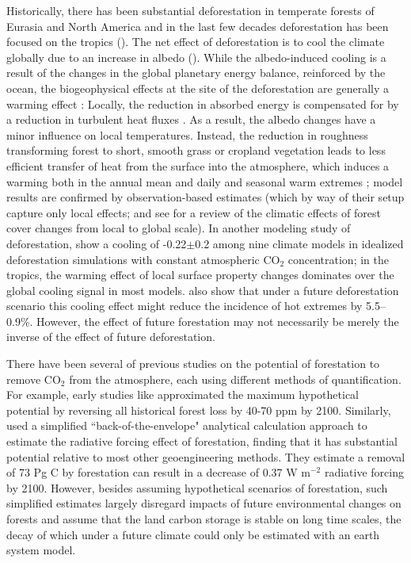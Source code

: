 \documentclass[]{article}
\begin{document}
Historically, there has been substantial deforestation in temperate forests of Eurasia and North America and in the last few decades deforestation has been focused on the tropics (\cite{goldewijk_estimating_2001}).
The net effect of deforestation is to cool the climate globally due to an increase in albedo (\cite{davin_climatic_2010}).
While the albedo-induced cooling is a result of the changes in the global planetary energy balance, reinforced by the ocean, the biogeophysical effects at the site of the deforestation are generally a warming effect \parencite{winckler_nonlocal_2019}: Locally, the reduction in absorbed energy is compensated for by a reduction in turbulent heat fluxes \parencite{winckler_importance_2019}.
As a result, the albedo changes have a minor influence on local temperatures.
Instead, the reduction in roughness transforming forest to short, smooth grass or cropland vegetation leads to less efficient transfer of heat from the surface into the atmosphere, which induces a warming both in the annual mean and daily and seasonal warm extremes \parencite{winckler_different_2019}; model results are confirmed by observation-based estimates (which by way of their setup capture only local effects;  \parencite{alkama_biophysical_2016,bright_local_2017} and see \cite{pongratz_land_2021} for a review of the climatic effects of forest cover changes from local to global scale).
In another modeling study of deforestation, \cite{boysen_global_2020} show a cooling of -0.22$\pm$0.2 \textcelsius{} among nine climate models in idealized deforestation simulations with constant atmospheric CO$_2$ concentration; in the tropics, the warming effect of local surface property changes dominates over the global cooling signal in most models.
\cite{hong_impacts_2022} also show that under a future deforestation scenario this cooling effect might reduce the incidence of hot extremes by 5.5--0.9\%.
However, the effect of future forestation may not necessarily be merely the inverse of the effect of future deforestation.

There have been several of previous studies on the potential of forestation to remove CO$_2$ from the atmosphere, each using different methods of quantification.
For example, early studies like \cite{house_maximum_2002} approximated the maximum hypothetical potential by reversing all historical forest loss by 40-70 ppm by 2100. Similarly, \cite{lenton_radiative_2009} used a simplified ``back-of-the-envelope" analytical calculation approach to estimate the radiative forcing effect of forestation, finding that it has substantial potential relative to most other geoengineering methods.
They estimate a removal of 73 Pg C by forestation can result in a decrease of 0.37 W m$^{-2}$ radiative forcing by 2100.
However, besides assuming hypothetical scenarios of forestation, such simplified estimates largely disregard impacts of future environmental changes on forests and assume that the land carbon storage is stable on long time scales, the decay of which under a future climate could only be estimated with an earth system model.
\end{document}
